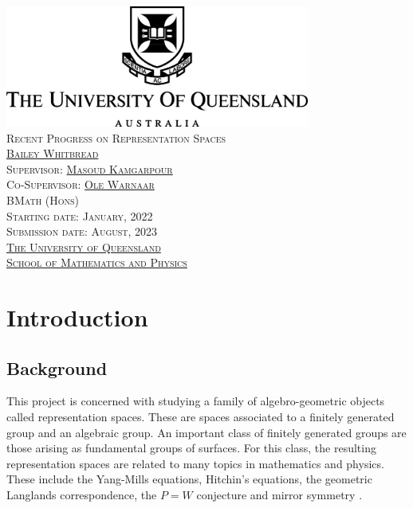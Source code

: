\documentclass{amsart}
\theoremstyle{plain}
\theoremstyle{definition}
\theoremstyle{remark}
\begin{document}
\begin{center}
\includegraphics[width=10cm]{UQLogo.jpg} \\ 
\vspace{3cm}
{\LARGE\textsc{Recent Progress on Representation Spaces}} \\ 
\vspace{0.3cm}
{\textsc{\href{https://baileywhitbread.com}{Bailey Whitbread}}} \\
\vspace{1cm}
{\textsc{Supervisor: \href{https://sites.google.com/site/masoudkomi/home}{Masoud Kamgarpour}}} \\
{\textsc{Co-Supervisor: \href{https://people.smp.uq.edu.au/OleWarnaar/}{Ole Warnaar}}} \\
\vspace{5cm}
{\textsc{BMath (Hons)}} \\
{\textsc{Starting date: January, 2022}} \\
{\textsc{Submission date: August, 2023}} \\
\vspace{1cm}
{\textsc{\href{https://www.uq.edu.au/}{The University of Queensland}}} \\
{\textsc{\href{https://smp.uq.edu.au/}{School of Mathematics and Physics}}}
\end{center}
\newpage
{}


\section{Introduction}
\subsection*{Background}
This project is concerned with studying a family of algebro-geometric objects called representation spaces. These are spaces associated to a finitely generated group and an algebraic group. An important class of finitely generated groups are those arising as fundamental groups of surfaces. For this class, the resulting representation spaces are related to many topics in mathematics and physics. These include the Yang-Mills equations, Hitchin's equations, the geometric Langlands correspondence, the $P=W$ conjecture and mirror symmetry \cite{Hausel13,BPGPNT14}. 
\end{document}

